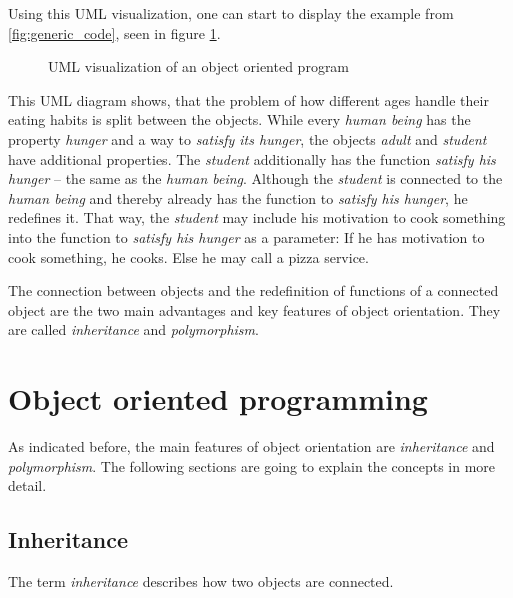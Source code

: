 Using this UML visualization, one can start to display the example from \ref{fig:generic_code}, seen in figure \ref{fig:uml_from_generic}. 
\begin{figure}[!h]
\begin{center}
\end{center}
\caption{UML visualization of an object oriented program}
\label{fig:uml_from_generic}
\end{figure}
This UML diagram shows, that the problem of how different ages handle their eating habits is split between the objects. While every \emph{human being} has the property \emph{hunger} and a way to \emph{satisfy its hunger}, the objects \emph{adult} and \emph{student} have additional properties. The \emph{student} additionally has the function \emph{satisfy his hunger} -- the same as the \emph{human being}. Although the \emph{student} is connected to the \emph{human being} and thereby already has the function to \emph{satisfy his hunger}, he redefines it. That way, the \emph{student} may include his motivation to cook something into the function to \emph{satisfy his hunger} as a parameter: If he has motivation to cook something, he cooks. Else he may call a pizza service.

The connection between objects and the redefinition of functions of a connected object are the two main advantages and key features of object orientation. They are called \emph{inheritance} and \emph{polymorphism}.


\chapter{Object oriented programming}
As indicated before, the main features of object orientation are \emph{inheritance} and \emph{polymorphism}. The following sections are going to explain the concepts in more detail.
\section{Inheritance}
The term \emph{inheritance} describes how two objects are connected. 

